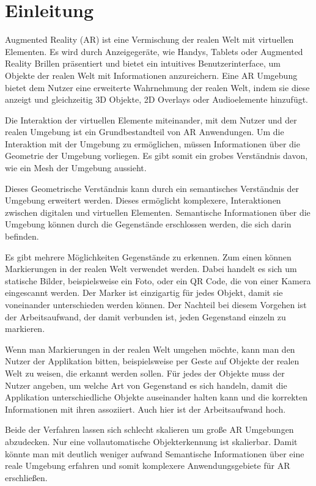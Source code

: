 \section{Einleitung}

Augmented Reality (AR) ist eine Vermischung der realen Welt mit virtuellen Elementen. Es wird durch Anzeigegeräte, wie Handys, Tablets oder Augmented Reality Brillen präsentiert und bietet ein intuitives Benutzerinterface, um Objekte der realen Welt mit Informationen anzureichern. Eine AR Umgebung bietet dem Nutzer eine erweiterte Wahrnehmung der realen Welt, indem sie diese anzeigt und gleichzeitig 3D Objekte, 2D Overlays oder Audioelemente  hinzufügt. 

Die Interaktion der virtuellen Elemente miteinander, mit dem Nutzer und der realen Umgebung ist ein Grundbestandteil von AR Anwendungen.
Um die Interaktion mit der Umgebung zu ermöglichen, müssen Informationen über die Geometrie der Umgebung vorliegen. Es gibt somit ein grobes Verständnis davon, wie ein Mesh der Umgebung aussieht. 

Dieses Geometrische Verständnis kann durch ein semantisches Verständnis der Umgebung erweitert werden. Dieses ermöglicht komplexere, Interaktionen zwischen digitalen und virtuellen Elementen. Semantische Informationen über die Umgebung können durch die Gegenstände erschlossen werden, die sich darin befinden.

Es gibt mehrere Möglichkeiten Gegenstände zu erkennen. Zum einen können Markierungen in der realen Welt verwendet werden. Dabei handelt es sich um statische Bilder, beispielsweise ein Foto, oder ein QR Code, die von einer Kamera eingescannt werden. Der Marker ist einzigartig für jedes Objekt, damit sie voneinander unterschieden werden können. Der Nachteil bei diesem Vorgehen ist der Arbeitsaufwand, der damit verbunden ist, jeden Gegenstand einzeln zu markieren.

Wenn man Markierungen in der realen Welt umgehen möchte, kann man den Nutzer der Applikation bitten, beispielsweise per Geste auf Objekte der realen Welt zu weisen, die erkannt werden sollen. Für jedes der Objekte muss der Nutzer angeben, um welche Art von Gegenstand es sich handeln, damit die Applikation unterschiedliche Objekte auseinander halten kann und die korrekten Informationen mit ihren assoziiert. Auch hier ist der Arbeitsaufwand hoch.

Beide der Verfahren lassen sich schlecht skalieren um große AR Umgebungen abzudecken. Nur eine vollautomatische Objekterkennung ist skalierbar. Damit könnte man mit deutlich weniger aufwand Semantische Informationen über eine reale Umgebung erfahren und somit komplexere Anwendungsgebiete für AR erschließen.

